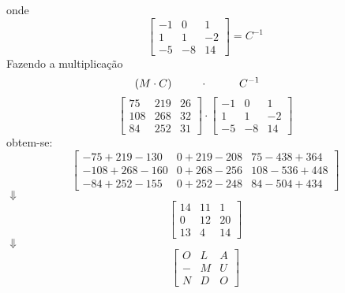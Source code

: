 \documentclass[12pt]{article}
\begin{document}
\begin{center}
		
		onde
		$$\begin{bmatrix}
			-1 & 0 & 1 \\
			1 & 1 & -2 \\
			-5 & -8 & 14
		\end{bmatrix} = C^{-1}$$
		Fazendo a multiplicação 
		$$(M\cdot C) \hspace{0.9cm}\cdot \hspace{1cm}C^{-1} \hspace{0.5cm}$$
		$$\begin{bmatrix}
			75 & 219 & 26 \\
			108 & 268 & 32 \\
			84 & 252 & 31
		\end{bmatrix} \cdot \begin{bmatrix}
			-1 & 0 & 1 \\
			1 & 1 & -2 \\
			-5 & -8 & 14
		\end{bmatrix}$$
		obtem-se:
		$$\begin{bmatrix}
			-75+219-130 & 0+219-208 & 75-438+364 \\
			-108+268-160 & 0+268-256 & 108-536+448 \\
			-84+252-155 & 0+252-248 & 84-504+434
		\end{bmatrix}$$ 
		$\Downarrow$ \\
		$$\begin{bmatrix}
			14 & 11 & 1 \\
			0 & 12 & 20 \\
			13 & 4 & 14 
		\end{bmatrix}$$
		$\Downarrow$ \\
		$$\begin{bmatrix}
			O & L & A \\
			- & M & U \\
			N & D & O
		\end{bmatrix}$$
		
	\end{center}
	
\end{document}
